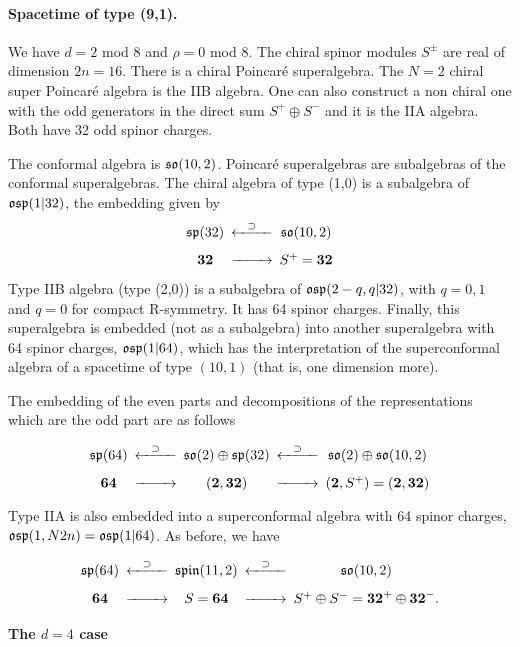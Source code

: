 \documentclass[a4paper,12pt]{article}
\begin{document}
\paragraph{ Spacetime of type (9,1).} We have $d=2$ mod 8 and
$\rho=0$ mod 8. The chiral spinor modules $S^\pm$ are real of
dimension $2n=16$. There is a chiral Poincar\'e superalgebra. The
$N=2$ chiral super Poincar\'e algebra is the IIB algebra. One can
also construct a non chiral one with the odd generators in the
direct sum $S^+\oplus S^-$ and it is the IIA algebra. Both have 32
odd spinor charges.

The conformal algebra is $\mathfrak{so}(10,2)$. Poincar\'e superalgebras
are subalgebras of the conformal superalgebras. The chiral algebra
of type (1,0) is a subalgebra of  $\mathfrak{osp}(1|32)$, the embedding
given by $$\begin{CD}\fsp(32)@<\supset<<\fso(10,2)
\\
 {\bf 32}@>>> S^+={\bf 32}
\end{CD}$$


 Type IIB
algebra (type (2,0)) is a subalgebra of $\mathfrak{osp}(2-q,q|32)$, with
$q=0,1$ and $q=0$ for compact R-symmetry. It has  64 spinor
charges. Finally, this superalgebra is embedded (not as a
subalgebra) into another superalgebra with 64 spinor charges,
$\mathfrak{osp}(1|64)$, which has the interpretation of the superconformal
algebra of a spacetime of type $(10,1)$ (that is, one dimension
more).


 The embedding of the even parts and
decompositions of the representations which are the odd part are
as follows

$$\begin{CD}\fsp(64)@<\supset<<\fso(2)\oplus \fsp(32)
@<\supset<<\fso(2)\oplus\fso(10,2)
\\
 {\bf 64}@>>>({\bf 2},{\bf 32})@>>>({\bf 2}, S^+)=({\bf 2},{\bf 32})
\end{CD}$$



Type IIA is also embedded into a superconformal algebra with 64
spinor charges, $\mathfrak{osp}(1,N2n)=\mathfrak{osp}(1|64)$. As before, we have

$$\begin{CD}\fsp(64)@<\supset<<\fspin(11,2)@<\supset<<\fso(10,2)
\\
 {\bf 64}@>>>S={\bf 64}@>>>S^+\oplus S^-={\bf 32}^+ \oplus {\bf 32}^-.
\end{CD}$$

\paragraph{The $d=4$ case}
\end{document}
